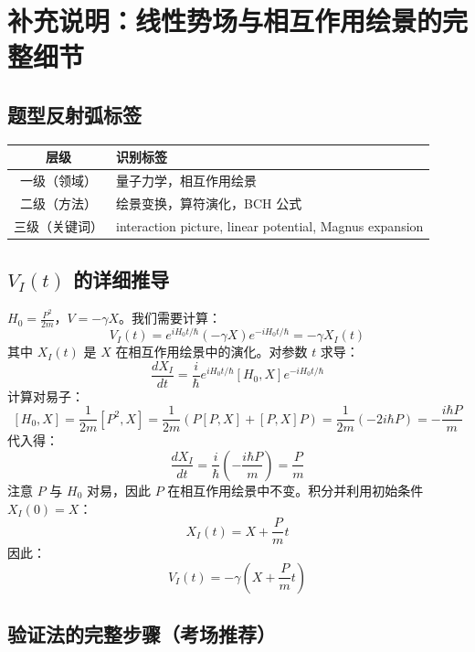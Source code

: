 \newpage
\section[【补】线性势场]{补充说明：线性势场与相互作用绘景的完整细节}

\subsection{题型反射弧标签}

\begin{center}
\begin{tabular}{|c|l|}
\hline
\textbf{层级} & \textbf{识别标签} \\
\hline
一级（领域） & 量子力学，相互作用绘景 \\
二级（方法） & 绘景变换，算符演化，BCH 公式 \\
三级（关键词） & interaction picture, linear potential, Magnus expansion \\
\hline
\end{tabular}
\end{center}


\subsection[VI(t) 的详细推导]{$V_I(t)$ 的详细推导}

$H_0 = \frac{P^2}{2m}$，$V = -\gamma X$。我们需要计算：
\[
V_I(t) = e^{iH_0 t/\hbar} (-\gamma X) e^{-iH_0 t/\hbar} = -\gamma X_I(t)
\]
其中 $X_I(t)$ 是 $X$ 在相互作用绘景中的演化。对参数 $t$ 求导：
\[
\frac{dX_I}{dt} = \frac{i}{\hbar} e^{iH_0 t/\hbar} [H_0, X] e^{-iH_0 t/\hbar}
\]
计算对易子：
\[
[H_0, X] = \frac{1}{2m}[P^2, X] = \frac{1}{2m}(P[P, X] + [P, X]P) = \frac{1}{2m}(-2i\hbar P) = -\frac{i\hbar P}{m}
\]
代入得：
\[
\frac{dX_I}{dt} = \frac{i}{\hbar} \left( -\frac{i\hbar P}{m} \right) = \frac{P}{m}
\]
注意 $P$ 与 $H_0$ 对易，因此 $P$ 在相互作用绘景中不变。积分并利用初始条件 $X_I(0) = X$：
\[
X_I(t) = X + \frac{P}{m}t
\]
因此：
\[
V_I(t) = -\gamma \left( X + \frac{P}{m}t \right)
\]

\subsection{验证法的完整步骤（考场推荐）}

